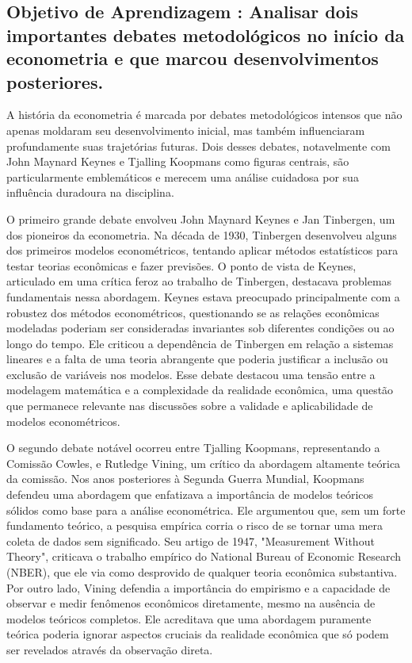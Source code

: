 \documentclass[a4paper,12pt]{article}[abntex2]
\begin{document}
\subsection{\textbf{Objetivo de Aprendizagem : Analisar dois importantes debates metodológicos no início da econometria e que marcou desenvolvimentos posteriores. }}
A história da econometria é marcada por debates metodológicos intensos que não apenas moldaram seu desenvolvimento inicial, mas também influenciaram profundamente suas trajetórias futuras. Dois desses debates, notavelmente com John Maynard Keynes e Tjalling Koopmans como figuras centrais, são particularmente emblemáticos e merecem uma análise cuidadosa por sua influência duradoura na disciplina.

O primeiro grande debate envolveu John Maynard Keynes e Jan Tinbergen, um dos pioneiros da econometria. Na década de 1930, Tinbergen desenvolveu alguns dos primeiros modelos econométricos, tentando aplicar métodos estatísticos para testar teorias econômicas e fazer previsões. O ponto de vista de Keynes, articulado em uma crítica feroz ao trabalho de Tinbergen, destacava problemas fundamentais nessa abordagem. Keynes estava preocupado principalmente com a robustez dos métodos econométricos, questionando se as relações econômicas modeladas poderiam ser consideradas invariantes sob diferentes condições ou ao longo do tempo. Ele criticou a dependência de Tinbergen em relação a sistemas lineares e a falta de uma teoria abrangente que poderia justificar a inclusão ou exclusão de variáveis nos modelos. Esse debate destacou uma tensão entre a modelagem matemática e a complexidade da realidade econômica, uma questão que permanece relevante nas discussões sobre a validade e aplicabilidade de modelos econométricos.

O segundo debate notável ocorreu entre Tjalling Koopmans, representando a Comissão Cowles, e Rutledge Vining, um crítico da abordagem altamente teórica da comissão. Nos anos posteriores à Segunda Guerra Mundial, Koopmans defendeu uma abordagem que enfatizava a importância de modelos teóricos sólidos como base para a análise econométrica. Ele argumentou que, sem um forte fundamento teórico, a pesquisa empírica corria o risco de se tornar uma mera coleta de dados sem significado. Seu artigo de 1947, "Measurement Without Theory", criticava o trabalho empírico do National Bureau of Economic Research (NBER), que ele via como desprovido de qualquer teoria econômica substantiva. Por outro lado, Vining defendia a importância do empirismo e a capacidade de observar e medir fenômenos econômicos diretamente, mesmo na ausência de modelos teóricos completos. Ele acreditava que uma abordagem puramente teórica poderia ignorar aspectos cruciais da realidade econômica que só podem ser revelados através da observação direta.
\end{document}
